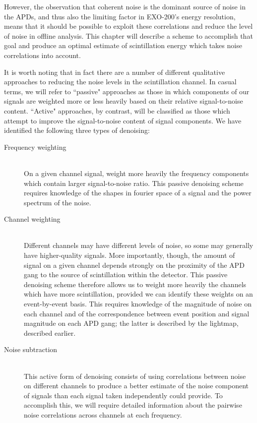 However, the observation that coherent noise is the dominant source of noise in the APDs, and thus also the limiting factor in EXO-200's energy resolution, means that it should be possible to exploit these correlations and reduce the level of noise in offline analysis.  This chapter will describe a scheme to accomplish that goal and produce an optimal estimate of scintillation energy which takes noise correlations into account.

It is worth noting that in fact there are a number of different qualitative approaches to reducing the noise levels in the scintillation channel.  In casual terms, we will refer to ``passive" approaches as those in which components of our signals are weighted more or less heavily based on their relative signal-to-noise content.  ``Active" approaches, by contrast, will be classified as those which attempt to improve the signal-to-noise content of signal components.  We have identified the following three types of denoising:
\begin{description}
\item[Frequency weighting] \hfill \\
On a given channel signal, weight more heavily the frequency components which contain larger signal-to-noise ratio.  This passive denoising scheme requires knowledge of the shapes in fourier space of a signal and the power spectrum of the noise.

\item[Channel weighting] \hfill \\
Different channels may have different levels of noise, so some may generally have higher-quality signals.  More importantly, though, the amount of signal on a given channel depends strongly on the proximity of the APD gang to the source of scintillation within the detector.  This passive denoising scheme therefore allows us to weight more heavily the channels which have more scintillation, provided we can identify these weights on an event-by-event basis.  This requires knowledge of the magnitude of noise on each channel and of the correspondence between event position and signal magnitude on each APD gang; the latter is described by the lightmap, described earlier.

\item[Noise subtraction] \hfill \\
This active form of denoising consists of using correlations between noise on different channels to produce a better estimate of the noise component of signals than each signal taken independently could provide.  To accomplish this, we will require detailed information about the pairwise noise correlations across channels at each frequency.
\end{description}

